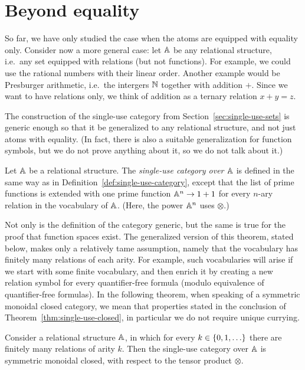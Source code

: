 \section{Beyond equality}
\label{sec:beyond-equality}

So far, we have only studied the case when the atoms are equipped with equality only. Consider now a more general case: let $\mathbb A$ be any relational structure, i.e.~any set equipped with relations (but not functions). For example, we could use the rational numbers with their linear order. Another example would be Presburger arithmetic, i.e.~the intergers ${\mathbb N}$ together with addition $+$. Since we want to have relations only, we think of addition as a ternary relation $x + y =z$. 

The construction of the single-use category from Section~\ref{sec:single-use-sets} is generic enough so that it be generalized to any relational structure, and not just atoms with equality. (In fact, there is also a suitable generalization for function symbols, but we do not prove anything about it, so we do not talk about it.)

\begin{definition}\label{def:single-use-category-relational-structures}
    Let $\mathbb A$ be a relational structure. The \emph{single-use category over $\mathbb A$} is defined in the same way as in Definition~\ref{def:single-use-category}, except that the list of prime functions is extended with one prime function  $\mathbb A^n \to 1 + 1$ 
        for every $n$-ary relation in the vocabulary of $\mathbb A$. (Here, the power $\mathbb A^n$ uses $\otimes$.)
\end{definition}


Not only is the definition of the category generic, but the same is true for  the proof that function spaces exist. The generalized version of this theorem, stated below, makes only a relatively tame assumption, namely that the vocabulary has finitely many relations of each arity. For example, such vocabularies will arise if we start with some finite vocabulary, and then enrich it by creating a new relation symbol for every quantifier-free formula (modulo equivalence of quantifier-free formulas). In the following theorem, when speaking of a symmetric monoidal closed category, we mean that properties stated in the conclusion of Theorem~\ref{thm:single-use-closed}, in particular we do not require unique currying.



\begin{theorem}\label{thm:single-use-closed-relational-structures}
    Consider a relational structure $\mathbb A$, in which for every $k \in \{0,1,\ldots\}$ there are finitely many relations of arity $k$. Then the single-use category over $\mathbb A$ is symmetric monoidal closed, with respect to the tensor product $\otimes$.
\end{theorem}

